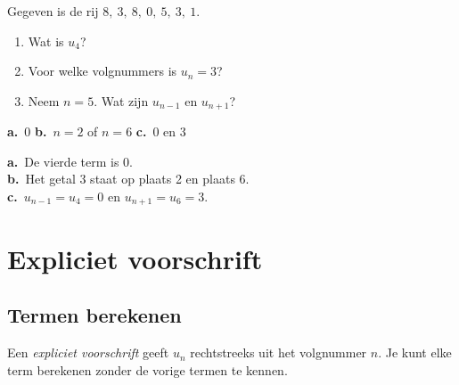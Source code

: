 \begin{oefeningen}
\begin{oefening}
Gegeven is de rij $8,\ 3,\ 8,\ 0,\ 5,\ 3,\ 1$.
\begin{enumerate}
  \item Wat is $u_4$?
  \item Voor welke volgnummers is $u_n = 3$?
  \item Neem $n = 5$. Wat zijn $u_{n-1}$ en $u_{n+1}$?
\end{enumerate}
\begin{solution}
\textbf{a.}~0 \quad \textbf{b.}~$n=2$ of $n=6$ \quad \textbf{c.}~0 en 3
\end{solution}
\begin{fullsolution}
\textbf{a.}~De vierde term is 0.\\
\textbf{b.}~Het getal 3 staat op plaats 2 en plaats 6.\\
\textbf{c.}~$u_{n-1}=u_4=0$ en $u_{n+1}=u_6=3$.
\end{fullsolution}
\end{oefening}
\end{oefeningen}

\section{Expliciet voorschrift}

\subsection{Termen berekenen}

\begin{theorie}
Een \emph{expliciet voorschrift} geeft $u_n$ rechtstreeks uit het volgnummer $n$. Je kunt elke term berekenen zonder de vorige termen te kennen.
\end{theorie}


